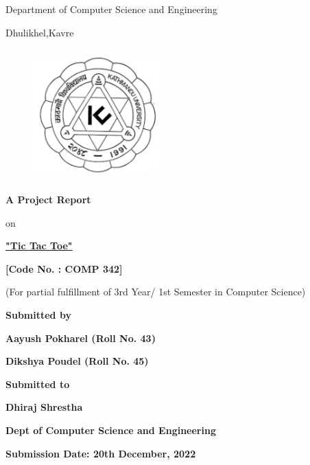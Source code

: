 \documentclass[12pt]{article}
\begin{document}
\thispagestyle{empty}

\section*{}
 {\LARGE{}}

\centerline{Department of Computer Science and Engineering}
\centerline{Dhulikhel,Kavre}
\begin{figure}[h]
    \centerline{\includegraphics[width=50.546mm,height=50.546mm]{KU_Logo.png}}
\end{figure}

\centerline{\textbf{A Project Report}}
\centerline{on}
\centerline{\underline{\textbf{"Tic Tac Toe"}}}

\vspace*{12mm}

\centerline{\textbf{[Code No. : COMP 342]}}
\centerline{(For partial fulfillment of 3rd Year/ 1st Semester in Computer Science)}

\vspace*{20mm}

\centerline{\textbf{Submitted by}}
\centerline{\textbf{Aayush Pokharel (Roll No. 43)}}
\centerline{\textbf{Dikshya Poudel (Roll No. 45)}}


\vspace*{26mm}


\centerline{\textbf{Submitted to}}
\centerline{\textbf{Dhiraj Shrestha}}
\centerline{\textbf{Dept of Computer Science and Engineering}}

\vspace*{20mm}

\centerline{\textbf{Submission Date: 20th December, 2022}}



\clearpage
\thispagestyle{empty}
\end{document}
